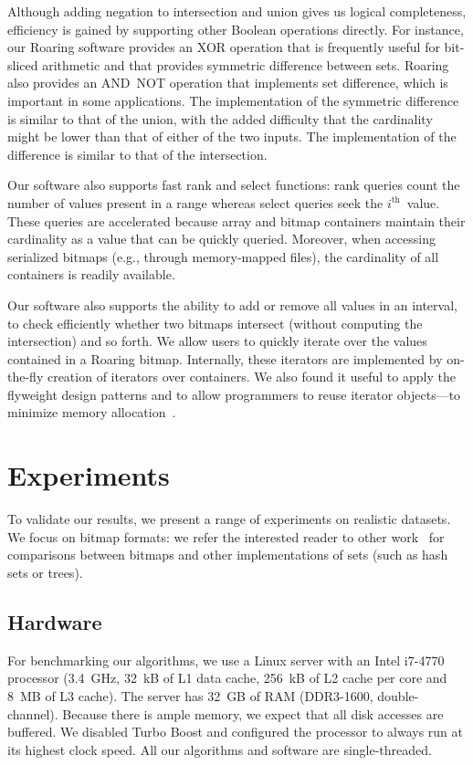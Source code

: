 \documentclass[times]{speauth}
\begin{document}
Although adding negation to intersection and union gives us logical completeness, efficiency is gained by supporting other Boolean
operations directly.  For instance, our Roaring software provides an XOR operation that is frequently useful for
bit-sliced arithmetic\cite{Rinfret:2001:BIA:375663.375669} and that provides symmetric difference
between sets.  Roaring also provides an AND~NOT operation that implements set difference, which is
important in some applications.
The implementation of the symmetric difference is similar to that of the union, with the added difficulty
that the cardinality might be lower than that of
either
of the two inputs.
The implementation of the  difference is similar to that of the intersection.

Our software also supports fast rank and select functions: rank queries count the number of values present in a range whereas select queries seek the $i^{\mathrm{th}}$~value. These queries are accelerated because array and bitmap containers maintain their cardinality as a value that can be quickly queried. 
Moreover, when accessing serialized bitmaps (e.g., through memory-mapped files), the cardinality of all containers is readily available.


Our software also supports the ability to add or remove all values in an interval,  to check efficiently whether two bitmaps intersect (without computing the intersection) and so forth.
We allow users 
to quickly iterate over the values contained in a Roaring bitmap. 
Internally, these iterators are implemented by on-the-fly creation of iterators over containers. We also found it useful to apply 
the flyweight design patterns and to allow programmers to reuse iterator objects---to minimize memory allocation~\cite{Gamma:1995:DPE:186897}.




\section{Experiments}\label{sec:exp}

To validate our results, we present a range of experiments
on realistic datasets.
We focus on bitmap formats: we refer the interested reader
to other work~\cite{colantonio:2010:ccn:1824821.1824857} for
comparisons between bitmaps and other implementations of
sets (such as hash sets or trees).

\subsection{Hardware}
For benchmarking our algorithms, we use   a Linux server with an Intel i7-4770 processor (\SI{3.4}{GHz}, \SI{32}{kB} of L1 data cache, \SI{256}{kB} of L2 cache per core and \SI{8}{MB} of L3 cache). The server
 has \SI{32}{GB} of RAM (DDR3-1600, double-channel).
 Because there is ample memory, we expect that all disk accesses are buffered.
 We disabled Turbo Boost and configured the processor to always run at its highest clock speed.
All our algorithms and software are single-threaded.
\end{document}
